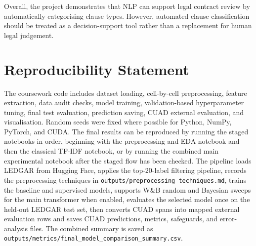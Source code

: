 \documentclass[11pt]{article}
\begin{document}
Overall, the project demonstrates that NLP can support legal contract review by automatically categorising clause types. However, automated clause classification should be treated as a decision-support tool rather than a replacement for human legal judgement.

\section*{Reproducibility Statement}

The coursework code includes dataset loading, cell-by-cell preprocessing, feature extraction, data audit checks, model training, validation-based hyperparameter tuning, final test evaluation, prediction saving, CUAD external evaluation, and visualisation. Random seeds were fixed where possible for Python, NumPy, PyTorch, and CUDA. The final results can be reproduced by running the staged notebooks in order, beginning with the preprocessing and EDA notebook and then the classical TF-IDF notebook, or by running the combined main experimental notebook after the staged flow has been checked. The pipeline loads LEDGAR from Hugging Face, applies the top-20-label filtering pipeline, records the preprocessing techniques in \texttt{outputs/preprocessing\_techniques.md}, trains the baseline and supervised models, supports W\&B random and Bayesian sweeps for the main transformer when enabled, evaluates the selected model once on the held-out LEDGAR test set, then converts CUAD spans into mapped external evaluation rows and saves CUAD predictions, metrics, safeguards, and error-analysis files. The combined summary is saved as \texttt{outputs/metrics/final\_model\_comparison\_summary.csv}.
\end{document}
